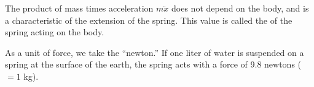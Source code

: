 The product of mass times acceleration $m\ddot{x}$ does not depend on the body, and is a characteristic of the extension of the spring. This value is called the  of the spring acting on the body.

As a unit of force, we take the ``newton.'' If one liter of water is suspended on a spring at the surface of the earth, the spring acts with a force of 9.8 newtons ($= 1$ kg).
